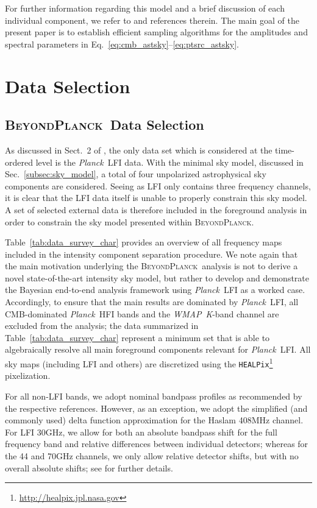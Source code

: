 \documentclass{aa}
\def\Planck{\textit{Planck}}
\def\,{\thinspace}
\def\WMAP{\emph{WMAP}}
\def\healpix{\texttt{HEALPix}}
\newcommand{\BP}{\textsc{BeyondPlanck}}
\begin{document}
For further information regarding this model and a brief discussion
of each individual component, we refer to
\citet{bp01} and references therein. The main goal of the present
paper is to establish efficient sampling algorithms for the amplitudes
and spectral parameters in Eq.~\eqref{eq:cmb_astsky}--\eqref{eq:ptsrc_astsky}. 

\section{Data Selection}
\label{sec:data}

\subsection{\BP\ Data Selection}
\label{subsec:bp_data_selection}

As discussed in Sect.~2 of \cite{bp01}, the only data set which is considered at the time-ordered level is the \Planck\ LFI data. With the minimal sky model, discussed in Sec.~\ref{subsec:sky_model}, a total of four unpolarized astrophysical sky components are considered. Seeing as LFI only contains three frequency channels, it is clear that the LFI data itself is unable to properly constrain this sky model. A set of selected external data is therefore included in the foreground analysis in order to constrain the sky model presented within \BP.

Table~\ref{tab:data_survey_char} provides an overview of all frequency
maps included in the intensity component separation procedure. We note again that the main motivation underlying the \BP\
analysis is not to derive a
novel state-of-the-art intensity sky model, but rather to develop and
demonstrate the Bayesian end-to-end analysis framework using
\Planck\ LFI as a worked case. Accordingly, to ensure that the main
results are dominated by \Planck\ LFI, all CMB-dominated \Planck\ HFI
bands and the \WMAP\ \textit{K}-band channel are excluded from the analysis;
the data summarized in Table~\ref{tab:data_survey_char} represent a
minimum set that is able to algebraically resolve all main foreground
components relevant for \Planck\ LFI. All sky maps (including LFI and
others) are discretized using the
\healpix\footnote{\url{http://healpix.jpl.nasa.gov}} \citep{gorski2005}
pixelization. 

For all non-LFI bands, we adopt nominal bandpass profiles as
recommended by the respective references. However, as an exception, we
adopt the simplified (and commonly used) delta function approximation
for the Haslam 408\,MHz channel. For LFI 30\,GHz, we allow for both an
absolute bandpass shift for the full frequency band and relative
differences between individual detectors; whereas for the 44 and 70\,GHz
channels, we only allow relative detector shifts, but with no overall
absolute shifts; see \citet{bp09} for further details.
\end{document}
